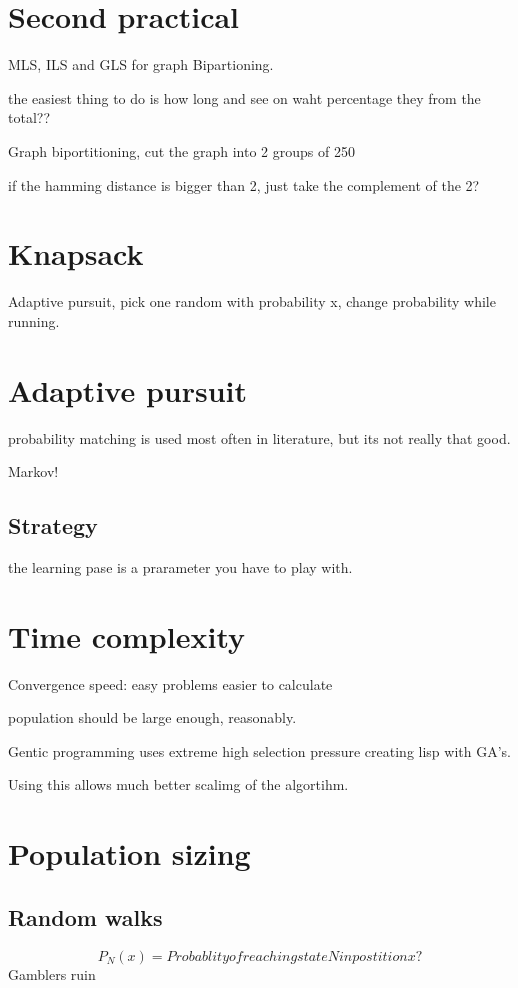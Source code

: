 \documentclass{article}
\begin{document}
\section{Second practical}

MLS, ILS and GLS for graph Bipartioning.

the easiest thing to do is how long and see on waht
percentage they from the total??


Graph biportitioning, cut the graph into 2 groups
of 250

if the hamming distance is bigger than 2, just take
the complement of the 2?

\section{Knapsack}
Adaptive pursuit, pick one random with probability x, change
probability while running.

\section{Adaptive pursuit}
probability matching is used most often in literature, but its not
really that good.

Markov!

\subsection{Strategy}
the learning pase is a prarameter you have to play with.

\section{Time complexity}
Convergence speed: easy problems easier to calculate

population should be large enough, reasonably.

Gentic programming uses extreme high selection pressure
	creating lisp with GA's.

Using this allows much better scalimg of the algortihm.

\section{Population sizing}
\subsection{Random walks}
\[ P_N(x) = Probablity of reaching state N in postition x?\]
Gamblers ruin
\end{document}
